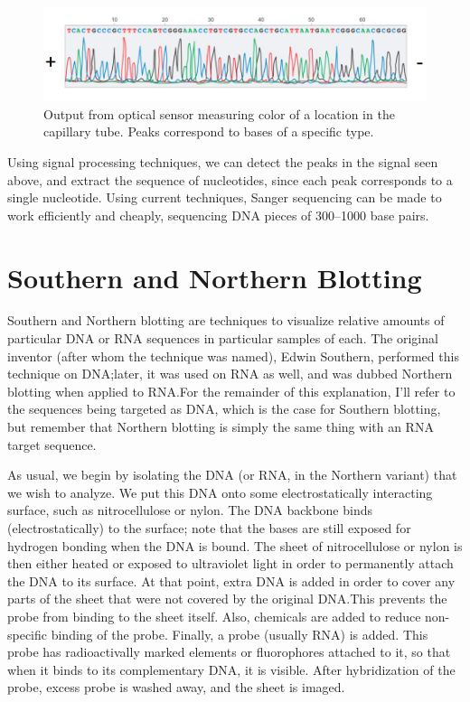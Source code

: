 \documentclass{article}
\begin{document}
\begin{figure}[h!]
    \centering
    \includegraphics[scale=0.5]{images/peaks.png}
    \caption{
        Output from optical sensor measuring color of a location in the capillary tube. Peaks
        correspond to bases of a specific type.
   }
\end{figure}

Using signal processing techniques, we can detect the peaks in the signal seen above, and extract
the sequence of nucleotides, since each peak corresponds to a single nucleotide. Using current
techniques, Sanger sequencing can be made to work efficiently and cheaply, sequencing DNA pieces of
300--1000 base pairs.

\section*{Southern and Northern Blotting}

Southern and Northern blotting are techniques to visualize relative amounts of particular DNA or RNA
sequences in particular samples of each. The original inventor (after whom the technique was named),
Edwin Southern, performed this technique on DNA;\@ later, it was used on RNA as well, and was dubbed
Northern blotting when applied to RNA.\@ For the remainder of this explanation, I'll refer to the
sequences being targeted as DNA, which is the case for Southern blotting, but remember that Northern
blotting is simply the same thing with an RNA target sequence.

As usual, we begin by isolating the DNA (or RNA, in the Northern variant) that we wish to analyze.
We put this DNA onto some electrostatically interacting surface, such as nitrocellulose or nylon.
The DNA backbone binds (electrostatically) to the surface; note that the bases are still exposed for
hydrogen bonding when the DNA is bound. The sheet of nitrocellulose or nylon is then either heated
or exposed to ultraviolet light in order to permanently attach the DNA to its surface. At that
point, extra DNA is added in order to cover any parts of the sheet that were not covered by the
original DNA.\@ This prevents the probe from binding to the sheet itself. Also, chemicals are added to
reduce non-specific binding of the probe. Finally, a probe (usually RNA) is added. This probe has
radioactivally marked elements or fluorophores attached to it, so that when it binds to its
complementary DNA, it is visible. After hybridization of the probe, excess probe is washed away, and
the sheet is imaged.
\end{document}
